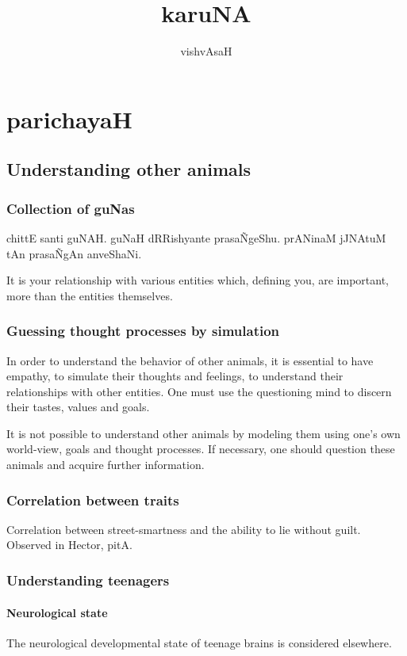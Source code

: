 \documentclass[oneside, article]{memoir}
\title{karuNA}
\author{vishvAsaH}
\begin{document}
\maketitle

\part{parichayaH}
\chapter{Understanding other animals}
\section{Collection of guNas}
chittE santi guNAH. guNaH dRRishyante prasa\~NgeShu. prANinaM jJNAtuM tAn prasa\~NgAn anveShaNi.

It is your relationship with various entities which, defining you, are important, more than the entities themselves.

\section{Guessing thought processes by simulation}
In order to understand the behavior of other animals, it is essential to have empathy, to simulate their thoughts and feelings, to understand their relationships with other entities. One must use the questioning mind to discern their tastes, values and goals.

It is not possible to understand other animals by modeling them using one's own world-view, goals and thought processes. If necessary, one should question these animals and acquire further information.

\section{Correlation between traits}
Correlation between street-smartness and the ability to lie without guilt. Observed in Hector, pitA.

\section{Understanding teenagers}
\subsection{Neurological state}
The neurological developmental state of teenage brains is considered elsewhere.
\end{document}
